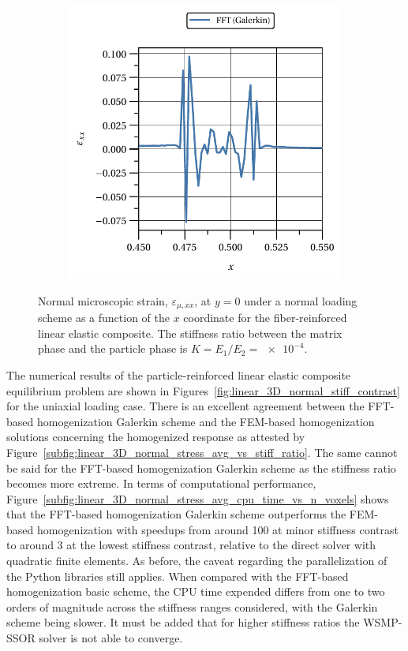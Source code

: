 \begin{figure}[hbt]
\begin{subfigure}[b]{0.49\textwidth}
      \includegraphics[width=\textwidth]{figures/linear_2D_ratio_-4_normal_strain_11_particle_2}
      \caption{}
      \label{subfig:linear_2D_ratio_-4_normal_strain_11_particle_2}
    \end{subfigure}
  \caption{Normal microscopic strain, \(\varepsilon_{\mu,xx}\), at \(y=0\) under a normal loading scheme as a function of the \(x\) coordinate for the fiber-reinforced linear elastic composite. The stiffness ratio between the matrix phase and the particle phase is \(K=E_1/E_2=\num{e-4}\).}
\label{fig:linear_2D_ratio_-4_normal_strain_11_particles}
\end{figure}

The numerical results of the particle-reinforced linear elastic composite equilibrium problem are shown in Figures~\ref{fig:linear_3D_normal_stiff_contrast} for the uniaxial loading case.
There is an excellent agreement between the FFT-based homogenization Galerkin scheme and the FEM-based homogenization solutions concerning the homogenized response as attested by Figure~\ref{subfig:linear_3D_normal_stress_avg_vs_stiff_ratio}.
The same cannot be said for the FFT-based homogenization Galerkin scheme as the stiffness ratio becomes more extreme.
In terms of computational performance, Figure~\ref{subfig:linear_3D_normal_stress_avg_cpu_time_vs_n_voxels} shows that the FFT-based homogenization Galerkin scheme outperforms the FEM-based homogenization with speedups from around 100 at minor stiffness contrast to around 3 at the lowest stiffness contrast, relative to the direct solver with quadratic finite elements.
As before, the caveat regarding the parallelization of the Python libraries still applies.
When compared with the FFT-based homogenization basic scheme, the CPU time expended differs from one to two orders of magnitude across the stiffness ranges considered, with the Galerkin scheme being slower.
It must be added that for higher stiffness ratios the WSMP-SSOR solver is not able to converge.


